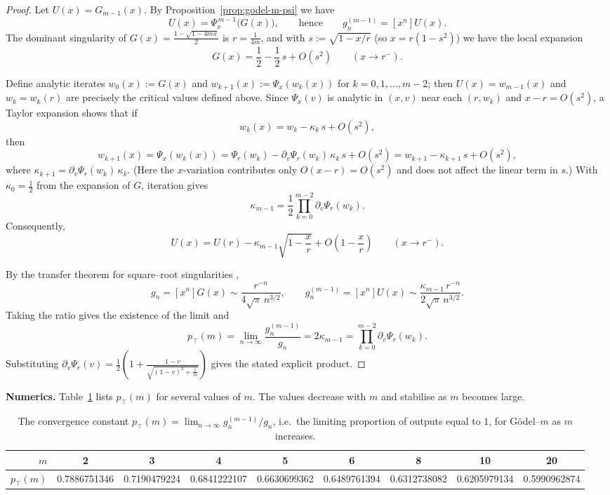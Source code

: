 \documentclass[11pt]{article}
\newcommand{\ptop}{p_{\top}}
\begin{document}
\begin{proof}
Let \(U(x)=G_{m-1}(x)\). By Proposition~\ref{prop:godel-m-psi} we have
\[
U(x)=\Psi_x^{\,m-1}\!\big(G(x)\big),
\qquad\text{hence}\qquad
g_n^{(m-1)}=[x^n]U(x).
\]
The dominant singularity of \(G(x)=\frac{1-\sqrt{1-4mx}}{2}\) is \(r=\frac{1}{4m}\), and with
\(s:=\sqrt{1-x/r}\) (so \(x=r(1-s^2)\)) we have the local expansion
\[
G(x)=\frac12-\frac12\,s+O(s^2)\qquad (x\to r^-).
\]

Define analytic iterates \(w_0(x):=G(x)\) and \(w_{k+1}(x):=\Psi_x(w_k(x))\) for
\(k=0,1,\dots,m-2\); then \(U(x)=w_{m-1}(x)\) and \(w_k=w_k(r)\) are precisely the critical
values defined above.
Since \(\Psi_x(v)\) is analytic in \((x,v)\) near each \((r,w_k)\) and \(x-r=O(s^2)\), a Taylor
expansion shows that if
\[
w_k(x)=w_k-\kappa_k\,s+O(s^2),
\]
then
\[
w_{k+1}(x)=\Psi_x(w_k(x))
=\Psi_r(w_k)-\partial_v\Psi_r(w_k)\,\kappa_k\,s+O(s^2)
=w_{k+1}-\kappa_{k+1}\,s+O(s^2),
\]
where \(\kappa_{k+1}=\partial_v\Psi_r(w_k)\,\kappa_k\).  (Here the \(x\)-variation contributes
only \(O(x-r)=O(s^2)\) and does not affect the linear term in \(s\).)  With \(\kappa_0=\frac12\)
from the expansion of \(G\), iteration gives
\[
\kappa_{m-1}=\frac12\prod_{k=0}^{m-2}\partial_v\Psi_r(w_k).
\]
Consequently,
\[
U(x)=U(r)-\kappa_{m-1}\sqrt{1-\frac{x}{r}}+O\!\left(1-\frac{x}{r}\right)\qquad (x\to r^-).
\]

By the transfer theorem for square--root singularities \cite[Ch.~VI]{FlajoletSedgewick2009},
\[
g_n=[x^n]G(x)\sim \frac{r^{-n}}{4\sqrt{\pi}\,n^{3/2}},
\qquad
g_n^{(m-1)}=[x^n]U(x)\sim \frac{\kappa_{m-1}\,r^{-n}}{2\sqrt{\pi}\,n^{3/2}}.
\]
Taking the ratio gives the existence of the limit and
\[
\ptop(m)=\lim_{n\to\infty}\frac{g_n^{(m-1)}}{g_n}=2\kappa_{m-1}
=\prod_{k=0}^{m-2}\partial_v\Psi_r(w_k).
\]
Substituting \(\partial_v\Psi_r(v)=\frac12\!\left(1+\frac{1-v}{\sqrt{(1-v)^2+\frac1m}}\right)\)
gives the stated explicit product.
\end{proof}

\FloatBarrier
\noindent
\textbf{Numerics.}
Table~\ref{tab:p1m} lists \(\ptop(m)\) for several values of \(m\).  The values decrease with \(m\)
and stabilise as \(m\) becomes large.
\begin{table}[H]
\centering
\tiny
\renewcommand{\arraystretch}{1.05}
\begin{tabular}{r|cccccccc}
\hline
\(m\) & 2 & 3 & 4 & 5 & 6 & 8 & 10 & 20 \\
\hline
\(\ptop(m)\) &
0.7886751346 &
0.7190479224 &
0.6841222107 &
0.6630699362 &
0.6489761394 &
0.6312738082 &
0.6205979134 &
0.5990962874 \\
\hline
\end{tabular}
\caption{The convergence constant \(\ptop(m)=\lim_{n\to\infty} g_n^{(m-1)}/g_n\), i.e.\ the limiting
proportion of outputs equal to \(1\), for Gödel--\(m\) as \(m\) increases.}
\label{tab:p1m}
\end{table}
\end{document}

